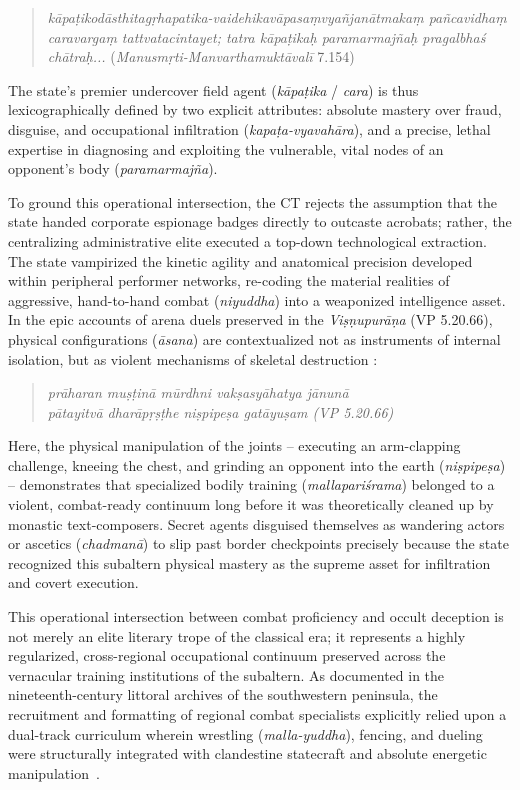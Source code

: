 \documentclass[11pt,twoside,letterpaper]{article}
\begin{document}
\begin{quote}
\textit{kāpaṭikodāsthitagṛhapatika-vaidehikavāpasaṃvyañjanātmakaṃ pañcavidhaṃ caravargaṃ tattvatacintayet; tatra kāpaṭikaḥ paramarmajñaḥ pragalbhaś chātraḥ...} (\textit{Manusmṛti-Manvarthamuktāvalī} 7.154)
\end{quote}

The state’s premier undercover field agent (\textit{kāpaṭika} / \textit{cara}) is thus lexicographically defined by two explicit attributes: absolute mastery over fraud, disguise, and occupational infiltration (\textit{kapaṭa-vyavahāra}), and a precise, lethal expertise in diagnosing and exploiting the vulnerable, vital nodes of an opponent’s body (\textit{paramarmajña}).

To ground this operational intersection, the CT rejects the assumption that the state handed corporate espionage badges directly to outcaste acrobats; rather, the centralizing administrative elite executed a top-down technological extraction. The state vampirized the kinetic agility and anatomical precision developed within peripheral performer networks, re-coding the material realities of aggressive, hand-to-hand combat (\textit{niyuddha}) into a weaponized intelligence asset. In the epic accounts of arena duels preserved in the \textit{Viṣṇupurāṇa} (VP 5.20.66), physical configurations (\textit{āsana}) are contextualized not as instruments of internal isolation, but as violent mechanisms of skeletal destruction \citep{ViP_5}:

\begin{quote}
\noindent\textit{prāharan muṣṭinā mūrdhni vakṣasyāhatya jānunā \\}
\noindent\textit{pātayitvā dharāpṛṣṭhe niṣpipeṣa gatāyuṣam (VP 5.20.66)}
\end{quote}

Here, the physical manipulation of the joints – executing an arm-clapping challenge, kneeing the chest, and grinding an opponent into the earth (\textit{niṣpipeṣa}) – demonstrates that specialized bodily training (\textit{mallapariśrama}) belonged to a violent, combat-ready continuum long before it was theoretically cleaned up by monastic text-composers. Secret agents disguised themselves as wandering actors or ascetics (\textit{chadmanā}) to slip past border checkpoints precisely because the state recognized this subaltern physical mastery as the supreme asset for infiltration and covert execution.

This operational intersection between combat proficiency and occult deception is not merely an elite literary trope of the classical era; it represents a highly regularized, cross-regional occupational continuum preserved across the vernacular training institutions of the subaltern. As documented in the nineteenth-century littoral archives of the southwestern peninsula, the recruitment and formatting of regional combat specialists explicitly relied upon a dual-track curriculum wherein wrestling (\textit{malla-yuddha}), fencing, and dueling were structurally integrated with clandestine statecraft and absolute energetic manipulation~\cite{vilanilam1971}. 
\end{document}
